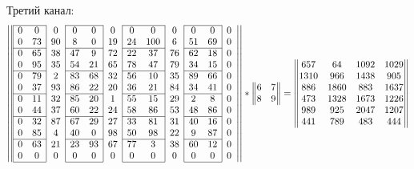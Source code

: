\documentclass[12pt, a4paper]{extarticle}
\begin{document}
\begin{enumerate}
        Третий канал:
        \begin{equation}
            \left|\left|
            \begin{array}{|cc|c|cc|c|cc|c|cc|c}
                \cline{1-2} \cline{4-5} \cline{7-8} \cline{10-11}
                0 & 0 & 0 & 0 & 0 & 0 & 0 & 0 & 0 & 0 & 0 & 0 \\
                0 & 73 & 90 & 8 & 0 & 19 & 24 & 100 & 6 & 51 & 69 & 0 \\
                \cline{1-2} \cline{4-5} \cline{7-8} \cline{10-11}
                0 & 65 & 38 & 47 & 9 & 72 & 22 & 37 & 76 & 62 & 18 & 0 \\
                0 & 95 & 35 & 54 & 21 & 65 & 78 & 47 & 79 & 34 & 15 & 0 \\
                \cline{1-2} \cline{4-5} \cline{7-8} \cline{10-11}
                0 & 79 & 2 & 83 & 68 & 32 & 56 & 10 & 35 & 89 & 66 & 0 \\
                0 & 37 & 93 & 86 & 22 & 20 & 36 & 21 & 84 & 34 & 41 & 0 \\
                \cline{1-2} \cline{4-5} \cline{7-8} \cline{10-11}
                0 & 11 & 32 & 85 & 20 & 1 & 55 & 15 & 29 & 2 & 8 & 0 \\
                0 & 44 & 37 & 60 & 22 & 24 & 58 & 86 & 53 & 48 & 86 & 0 \\
                \cline{1-2} \cline{4-5} \cline{7-8} \cline{10-11}
                0 & 32 & 87 & 67 & 29 & 27 & 33 & 81 & 31 & 40 & 16 & 0 \\
                0 & 85 & 4 & 40 & 0 & 98 & 50 & 98 & 22 & 9 & 87 & 0 \\
                \cline{1-2} \cline{4-5} \cline{7-8} \cline{10-11}
                0 & 63 & 21 & 23 & 93 & 67 & 77 & 3 & 38 & 60 & 12 & 0 \\
                0 & 0 & 0 & 0 & 0 & 0 & 0 & 0 & 0 & 0 & 0 & 0 \\
                \cline{1-2} \cline{4-5} \cline{7-8} \cline{10-11}
            \end{array}\right|\right|
            \ast
            \begin{Vmatrix}
                6 & 7 \\
                8 & 9
            \end{Vmatrix}
            =
            \begin{Vmatrix}
                657 & 64 & 1092 & 1029 \\
                1310 & 966 & 1438 & 905 \\
                886 & 1860 & 883 & 1637 \\
                473 & 1328 & 1673 & 1226 \\
                989 & 925 & 2047 & 1207 \\
                441 & 789 & 483 & 444 \\
            \end{Vmatrix}
        \end{equation}
        

\end{enumerate}
\end{document}
